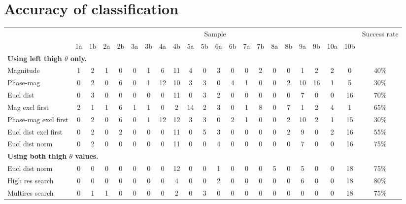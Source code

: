 \section{Accuracy of classification}

\begin{landscape}
	\begin{table}[ht]
		\centering
		\begin{tabular}{|l|c@{ }c|c@{ }c|c@{ }c|c@{ }c|c@{ }c|c@{ }c|c@{ }c|c@{ }c|c@{ }c|c@{ }c|c|}
			\hline
			& \multicolumn{20}{|c|}{Sample} & Success rate \\
			& 1a & 1b & 2a & 2b & 3a & 3b & 4a & 4b & 5a & 5b & 6a & 6b & 7a & 7b & 8a & 8b & 9a & 9b & 10a & 10b & \\
			
			\hline
			\multicolumn{22}{|l|}{\textbf{Using left thigh $\theta$ only.}} \\
			Magnitude                  & 1 & 2 & 1 & 0 & 0 & 1 & 6 & 11 & 4 & 0 & 3 & 0 & 0 & 2 & 0 & 0 & 1 & 2 & 2 & 0 & 40\% \\
			Phase-mag                  & 0 & 2 & 0 & 6 & 0 & 1 & 12 & 10 & 3 & 3 & 0 & 4 & 1 & 0 & 0 & 2 & 10 & 16 & 1 & 5 & 30\% \\
			Eucl dist                  & 0 & 3 & 0 & 0 & 0 & 0 & 0 & 11 & 0 & 3 & 2 & 0 & 0 & 0 & 0 & 0 & 7 & 0 & 0 & 16 & 70\% \\
			Mag excl first             & 2 & 1 & 1 & 6 & 1 & 1 & 0 & 2 & 14 & 2 & 3 & 0 & 1 & 8 & 0 & 7 & 1 & 2 & 4 & 1 & 65\% \\
			Phase-mag excl first       & 0 & 2 & 0 & 6 & 0 & 1 & 12 & 12 & 3 & 3 & 0 & 2 & 1 & 0 & 0 & 2 & 10 & 2 & 1 & 15 & 30\% \\
			Eucl dist excl first       & 0 & 2 & 0 & 2 & 0 & 0 & 0 & 11 & 0 & 5 & 3 & 0 & 0 & 0 & 0 & 2 & 9 & 0 & 2 & 16 & 55\% \\
			Eucl dist norm             & 0 & 2 & 0 & 0 & 0 & 0 & 0 & 11 & 0 & 0 & 4 & 0 & 0 & 0 & 0 & 0 & 7 & 0 & 0 & 16 & 75\% \\
			
			\hline
			\multicolumn{22}{|l|}{\textbf{Using both thigh $\theta$ values.}} \\
			Eucl dist norm             & 0 & 0 & 0 & 0 & 0 & 0 & 0 & 12 & 0 & 0 & 1 & 0 & 0 & 0 & 5 & 0 & 5 & 0 & 0 & 18 & 75\% \\
			High res search            & 0 & 0 & 0 & 0 & 0 & 0 & 0 & 4 & 0 & 0 & 2 & 0 & 0 & 0 & 0 & 0 & 6 & 0 & 0 & 18 & 80\% \\
			Multires search            & 0 & 1 & 1 & 0 & 0 & 0 & 0 & 2 & 0 & 3 & 0 & 0 & 0 & 0 & 0 & 0 & 0 & 0 & 0 & 18 & 75\% \\
			

\end{tabular}
\end{table}
\end{landscape}
